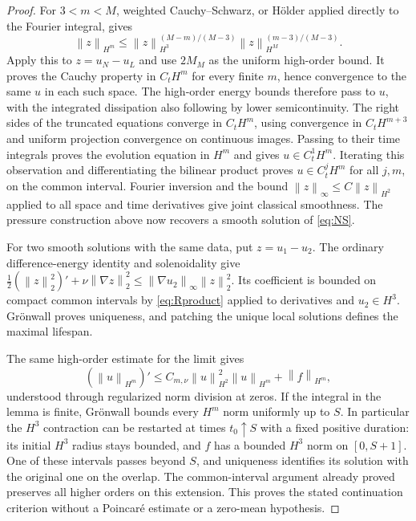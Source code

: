 \documentclass[11pt,a4paper]{article}
\theoremstyle{definition}\newtheorem{definition}[theorem]{Definition}
\theoremstyle{remark}\newtheorem{remark}[theorem]{Remark}
\newcommand{\norm}[1]{\left\lVert#1\right\rVert}
\begin{document}
\begin{proof}
For $3<m<M$, weighted Cauchy--Schwarz, or H\"older applied directly to the Fourier integral, gives
\[
 \norm{z}_{H^m}\le
 \norm{z}_{H^3}^{(M-m)/(M-3)}\norm{z}_{H^M}^{(m-3)/(M-3)}.
\]
Apply this to $z=u_N-u_L$ and use $2M_M$ as the uniform high-order bound. It proves the Cauchy property in $C_tH^m$ for every finite $m$, hence convergence to the same $u$ in each such space. The high-order energy bounds therefore pass to $u$, with the integrated dissipation also following by lower semicontinuity. The right sides of the truncated equations converge in $C_tH^m$, using convergence in $C_tH^{m+3}$ and uniform projection convergence on continuous images. Passing to their time integrals proves the evolution equation in $H^m$ and gives $u\in C^1_tH^m$. Iterating this observation and differentiating the bilinear product proves $u\in C^j_tH^m$ for all $j,m$, on the common interval. Fourier inversion and the bound $\norm{z}_\infty\le C\norm{z}_{H^2}$ applied to all space and time derivatives give joint classical smoothness. The pressure construction above now recovers a smooth solution of \eqref{eq:NS}.

For two smooth solutions with the same data, put $z=u_1-u_2$. The ordinary difference-energy identity and solenoidality give
$\tfrac12(\norm{z}_2^2)'+\nu\norm{\nabla z}_2^2
\le\norm{\nabla u_2}_\infty\norm{z}_2^2$.
Its coefficient is bounded on compact common intervals by \eqref{eq:Rproduct} applied to derivatives and $u_2\in H^3$. Gr\"onwall proves uniqueness, and patching the unique local solutions defines the maximal lifespan.

The same high-order estimate for the limit gives
\[
 (\norm{u}_{H^m})'
 \le C_{m,\nu}\norm{u}_{H^2}^2\norm{u}_{H^m}+\norm{f}_{H^m},
\]
understood through regularized norm division at zeros. If the integral in the lemma is finite, Gr\"onwall bounds every $H^m$ norm uniformly up to $S$. In particular the $H^3$ contraction can be restarted at times $t_0\uparrow S$ with a fixed positive duration: its initial $H^3$ radius stays bounded, and $f$ has a bounded $H^3$ norm on $[0,S+1]$. One of these intervals passes beyond $S$, and uniqueness identifies its solution with the original one on the overlap. The common-interval argument already proved preserves all higher orders on this extension. This proves the stated continuation criterion without a Poincar\'e estimate or a zero-mean hypothesis.
\end{proof}
\end{document}
